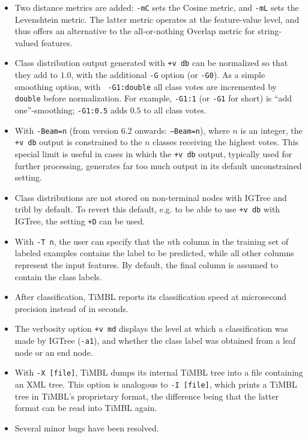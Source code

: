 \documentclass{book}
\begin{document}
\begin{itemize}

\item Two distance metrics are added: {\tt -mC} sets the Cosine
  metric, and {\tt -mL} sets the Levenshtein metric. The latter metric
  operates at the feature-value level, and thus offers an alternative
  to the all-or-nothing Overlap metric for string-valued features.

\item Class distribution output generated with {\tt +v db} can be
  normalized so that they add to $1.0$, with the additional {\tt -G}
  option (or {\tt -G0}). As a simple smoothing option, with {\tt
    -G1:double} all class votes are incremented by {\tt double} before
  normalization.  For example, {\tt -G1:1} (or {\tt -G1} for short) is
  ``add one''-smoothing; {\tt -G1:0.5} adds $0.5$ to all class votes.

\item With {\tt -Beam=n} (from version 6.2 onwards: {\tt --Beam=n}),
  where $n$ is an integer, the {\tt +v db} output is constrained to
  the $n$ classes receiving the highest votes. This special limit is
  useful in cases in which the {\tt +v db} output, typically used for
  further processing, generates far too much output in its default
  unconstrained setting.

\item Class distributions are not stored on non-terminal nodes with
  {\sc IGTree} and {\sc tribl} by default. To revert this default,
  e.g. to be able to use {\tt +v db} with {\sc IGTree}, the setting
  {\tt +D} can be used.

\item With {\tt -T n}, the user can specify that the $n$th column in
 the training set of labeled examples contains the label to be
 predicted, while all other columns represent the input features. By
 default, the final column is assumed to contain the class labels.

\item After classification, TiMBL reports its classification speed at
  microsecond precision instead of in seconds.

\item The verbosity option {\tt +v md} displays the level at which a
  classification was made by {\sc IGTree} ({\tt -a1}), and whether the
  class label was obtained from a leaf node or an end node.

\item With {\tt -X [file]}, TiMBL dumps its internal TiMBL tree into a
  file containing an XML tree. This option is analogous to {\tt -I
    [file]}, which prints a TiMBL tree in TiMBL's proprietary format,
  the difference being that the latter format can be read into TiMBL
  again.

\item Several minor bugs have been resolved.

\end{itemize}
\end{document}
